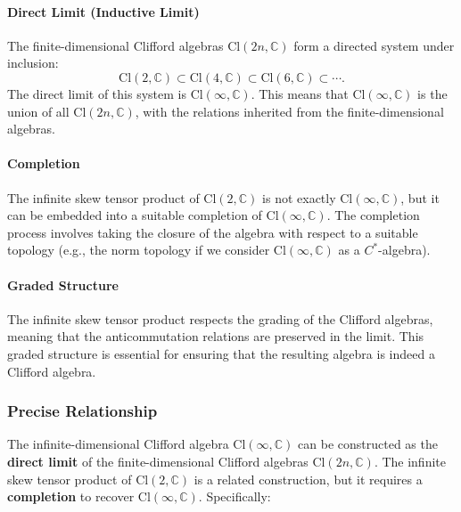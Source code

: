 \documentclass{article}
\begin{document}
\paragraph{Direct Limit (Inductive Limit)}

The finite-dimensional Clifford algebras $\text{Cl}(2n, \mathbb{C})$ form a
directed system under inclusion: 
\begin{equation*}
\text{Cl}(2, \mathbb{C}) \subset \text{Cl}(4, \mathbb{C}) \subset \text{Cl}%
(6, \mathbb{C}) \subset \cdots. 
\end{equation*}
The direct limit of this system is $\text{Cl}(\infty, \mathbb{C})$. This
means that $\text{Cl}(\infty, \mathbb{C})$ is the union of all $\text{Cl}%
(2n, \mathbb{C})$, with the relations inherited from the finite-dimensional
algebras.

\paragraph{Completion}

The infinite skew tensor product of $\text{Cl}(2, \mathbb{C})$ is not
exactly $\text{Cl}(\infty, \mathbb{C})$, but it can be embedded into a
suitable completion of $\text{Cl}(\infty, \mathbb{C})$. The completion
process involves taking the closure of the algebra with respect to a
suitable topology (e.g., the norm topology if we consider $\text{Cl}(\infty, 
\mathbb{C})$ as a $C^*$-algebra).

\paragraph{Graded Structure}

The infinite skew tensor product respects the grading of the Clifford
algebras, meaning that the anticommutation relations are preserved in the
limit. This graded structure is essential for ensuring that the resulting
algebra is indeed a Clifford algebra.

\subsubsection{Precise Relationship}

The infinite-dimensional Clifford algebra $\text{Cl}(\infty, \mathbb{C})$
can be constructed as the \textbf{direct limit} of the finite-dimensional
Clifford algebras $\text{Cl}(2n, \mathbb{C})$. The infinite skew tensor
product of $\text{Cl}(2, \mathbb{C})$ is a related construction, but it
requires a \textbf{completion} to recover $\text{Cl}(\infty, \mathbb{C})$.
Specifically:
\end{document}
